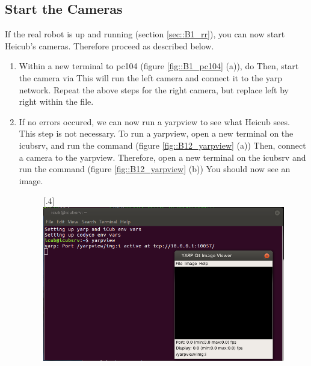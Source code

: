 \subsection{Start the Cameras}
\label{sec::B12_sc}
If the real robot is up and running (section \ref{sec::B1_rr}), you can now start Heicub's cameras. Therefore proceed as described below.
\begin{enumerate}
	\item Within a new terminal to pc104 (figure \ref{fig::B1_pc104} (a)), do \newline {}\newline Then, start the camera via \newline {}\newline This will run the left camera and connect it to the yarp network. Repeat the above steps for the right camera, but replace left by right within the  file.
	\item If no errors occured, we can now run a yarpview to see what Heicub sees. This step is not necessary. To run a yarpview, open a new terminal on the icubsrv, and run the command \newline {} (figure \ref{fig::B12_yarpview} (a)) \newline Then, connect a camera to the yarpview. Therefore, open a new terminal on the icubsrv and run the command \newline {} (figure \ref{fig::B12_yarpview} (b)) \newline You should now see an image.
	\begin{figure}[h!]
		\centering
		[.4\linewidth]{\includegraphics[scale=.22]{chapters/06_appendix/img/yarpview.png}}

\end{figure}
\end{enumerate}

